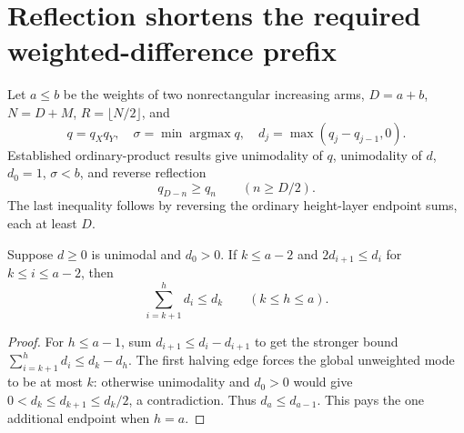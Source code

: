 \section{Reflection shortens the required weighted-difference prefix}
Let $a\le b$ be the weights of two nonrectangular increasing arms,
$D=a+b$, $N=D+M$, $R=\lfloor N/2\rfloor$, and
\[
 q=q_Xq_Y,\quad \sigma=\min\operatorname{argmax}q,
 \quad d_j=\max(q_j-q_{j-1},0).
\]
Established ordinary-product results give unimodality of $q$,
unimodality of $d$, $d_0=1$, $\sigma<b$, and reverse reflection
\[
                         q_{D-n}\ge q_n\qquad(n\ge D/2).
\]
The last inequality follows by reversing the ordinary height-layer
endpoint sums, each at least $D$.

\begin{lemma}
Suppose $d\ge0$ is unimodal and $d_0>0$.
If $k\le a-2$ and $2d_{i+1}\le d_i$ for $k\le i\le a-2$,
then
\[
                   \sum_{i=k+1}^{h}d_i\le d_k
                              \qquad(k\le h\le a).
\]
\end{lemma}
\begin{proof}
For $h\le a-1$, sum $d_{i+1}\le d_i-d_{i+1}$ to get
the stronger bound $\sum_{i=k+1}^h d_i\le d_k-d_h$.
The first halving edge forces the global unweighted mode to
be at most $k$: otherwise unimodality and $d_0>0$ would give
$0<d_k\le d_{k+1}\le d_k/2$, a contradiction.
Thus $d_a\le d_{a-1}$. This pays the one additional endpoint
when $h=a$.
\end{proof}

